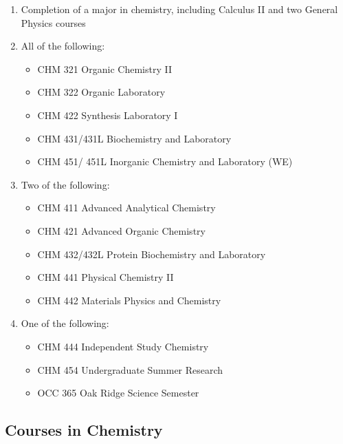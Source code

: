 \documentclass[
  letterpaper,
]{scrbook}
\providecommand{\tightlist}{%
  \setlength{\itemsep}{0pt}\setlength{\parskip}{0pt}}
\begin{document}
\begin{enumerate}
\def\labelenumi{\arabic{enumi}.}
\item
  Completion of a major in chemistry, including Calculus II and two
  General Physics courses
\item
  All of the following:

  \begin{itemize}
  \tightlist
  \item
    CHM 321 Organic Chemistry II
  \item
    CHM 322 Organic Laboratory
  \item
    CHM 422 Synthesis Laboratory I
  \item
    CHM 431/431L Biochemistry and Laboratory
  \item
    CHM 451/ 451L Inorganic Chemistry and Laboratory (WE)
  \end{itemize}
\item
  Two of the following:

  \begin{itemize}
  \tightlist
  \item
    CHM 411 Advanced Analytical Chemistry
  \item
    CHM 421 Advanced Organic Chemistry
  \item
    CHM 432/432L Protein Biochemistry and Laboratory
  \item
    CHM 441 Physical Chemistry II
  \item
    CHM 442 Materials Physics and Chemistry
  \end{itemize}
\item
  One of the following:

  \begin{itemize}
  \tightlist
  \item
    CHM 444 Independent Study Chemistry
  \item
    CHM 454 Undergraduate Summer Research
  \item
    OCC 365 Oak Ridge Science Semester
  \end{itemize}
\end{enumerate}

\subsection{Courses in Chemistry}\label{courses-in-chemistry}
\end{document}
